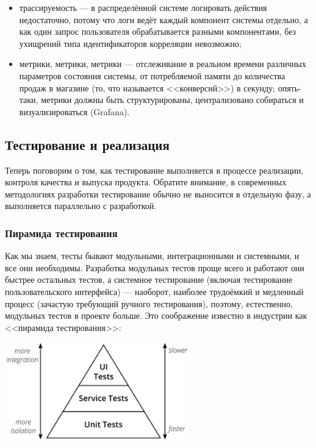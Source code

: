 \documentclass{../../text-style}
\begin{document}
\begin{itemize}
\begin{itemize}
        \item трассируемость --- в распределённой системе логировать действия недостаточно, потому что логи ведёт каждый компонент системы отдельно, а как один запрос пользователя обрабатывается разными компонентами, без ухищрений типа идентификаторов корреляции невозможно;
        \item метрики, метрики, метрики --- отслеживание в реальном времени различных параметров состояния системы, от потребляемой памяти до количества продаж в магазине (то, что называется <<конверсий>>) в секунду; опять-таки, метрики должны быть структурированы, централизовано собираться и визуализироваться (Grafana).
    \end{itemize}
\end{itemize}

\subsection{Тестирование и реализация}

Теперь поговорим о том, как тестирование выполняется в процессе реализации, контроля качества и выпуска продукта. Обратите внимание, в современных методологиях разработки тестирование обычно не выносится в отдельную фазу, а выполняется параллельно с разработкой.

\subsubsection{Пирамида тестирования}

Как мы знаем, тесты бывают модульными, интеграционными и системными, и все они необходимы. Разработка модульных тестов проще всего и работают они быстрее остальных тестов, а системное тестирование (включая тестирование пользовательского интерфейса) --- наоборот, наиболее трудоёмкий и медленный процесс (зачастую требующий ручного тестирования), поэтому, естественно, модульных тестов в проекте больше. Это соображение известно в индустрии как <<пирамида тестирования>>:

\begin{center}
    \includegraphics[width=0.6\textwidth]{testPyramid.png}
\end{center}
\end{document}
